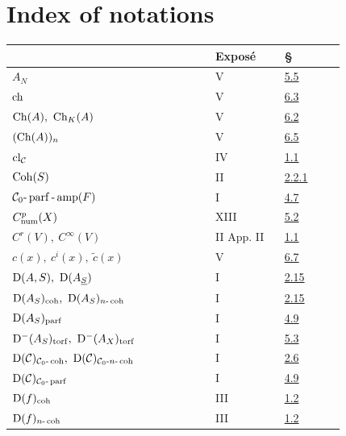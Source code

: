 \newpage
{}\section*{Index of notations}
\begingroup\small
\begin{longtable}{@{}>{\raggedright\arraybackslash}p{0.50\linewidth}>{\raggedright\arraybackslash}p{0.17\linewidth}>{\raggedright\arraybackslash}p{0.15\linewidth}@{}}
\toprule
 & Exposé & §\\
\midrule
\endhead
\(A_N\) & V & \hyperlink{sga6.e05.para.5-5}{5.5}\\
\(\operatorname{ch}\) & V & \hyperlink{sga6.e05.para.6-3}{6.3}\\
\(\Ch(A),\ \Ch_K(A)\) & V & \hyperlink{sga6.e05.def.6-2}{6.2}\\
\((\operatorname{Ch}(A))_n\) & V & \hyperlink{sga6.e05.prop.6-5}{6.5}\\
\(\operatorname{cl}_{\mathcal C}\) & IV & \hyperlink{sga6.e04.para.1-1}{1.1}\\
\(\operatorname{Coh}(S)\) & II & \hyperlink{sga6.e02.notation.2-2-1}{2.2.1}\\
\(\mathcal C_0\text{-}\operatorname{parf}\text{-}\operatorname{amp}(F)\) & I & \hyperlink{sga6.e01.def.4-7}{4.7}\\
\(C^p_{\operatorname{num}}(X)\) & XIII & \hyperlink{sga6.e13.prop.5-2}{5.2}\\
\(C^r(V),\ C^\infty(V)\) & II App. II & \hyperlink{sga6.e02.sec.1.1}{1.1}\\
\(c(x),\ c^i(x),\ \widetilde c(x)\) & V & \hyperlink{sga6.e05.para.6-7}{6.7}\\
\(\Dcat(A,S),\ \Dcat(A_{\underline S})\) & I & \hyperlink{sga6.e01.ex.2-15}{2.15}\\
\(\Dcat(A_S)_{\coh},\ \Dcat(A_S)_{n\text{-}\coh}\) & I & \hyperlink{sga6.e01.ex.2-15}{2.15}\\
\(\mathrm D(A_S)_{\operatorname{parf}}\) & I & \hyperlink{sga6.e01.notation.4-9}{4.9}\\
\(\Dcat^{-}(A_S)_{\torf},\ \Dcat^{-}(A_X)_{\torf}\) & I & \hyperlink{sga6.e01.para.5-3}{5.3}\\
\(\mathrm D(\mathcal C)_{\mathcal C_0\text{-}\operatorname{coh}},\ \mathrm D(\mathcal C)_{\mathcal C_0\text{-}n\text{-}\operatorname{coh}}\) & I & \hyperlink{sga6.e01.schol.2-6}{2.6}\\
\(\mathrm D(\mathcal C)_{\mathcal C_0\text{-}\operatorname{parf}}\) & I & \hyperlink{sga6.e01.notation.4-9}{4.9}\\
\(\mathrm D(f)_{\operatorname{coh}}\) & III & \hyperlink{sga6.e03.def.1-2}{1.2}\\
\(\mathrm D(f)_{n\text{-}\operatorname{coh}}\) & III & \hyperlink{sga6.e03.def.1-2}{1.2}\\

\end{longtable}
